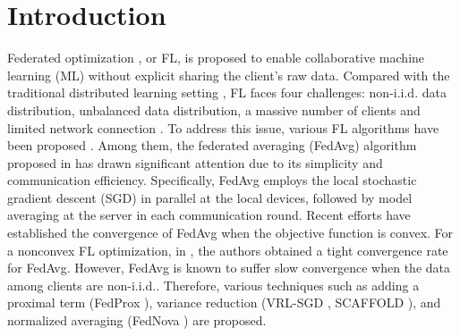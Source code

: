 \documentclass[twoside,journal]{IEEEtran}
\begin{document}






%
\IEEEpeerreviewmaketitle


\vspace{-0.3cm}
\section{Introduction}
\vspace{-0.0cm}
Federated optimization \cite{McMahan2017,li2019federated,yang2019federated}, or FL, is proposed to enable collaborative machine learning (ML) without explicit sharing the client's raw data.
Compared with the traditional distributed learning setting \cite{chang2020distributed}, FL faces four challenges: non-i.i.d. data distribution, unbalanced data distribution, a massive number of clients and limited network connection \cite{konevcny2016federated}. To address this issue, various FL algorithms have been proposed \cite{yang2019federated}. Among them, the federated averaging (FedAvg) algorithm proposed in \cite{McMahan2017} has drawn significant attention due to its simplicity and communication efficiency. Specifically, FedAvg employs the local stochastic gradient descent (SGD) \cite{stich2018local} in parallel at the local devices, followed by model averaging at the server in each communication round. Recent efforts \cite{li2019convergence,khaled2019first} have established the convergence of FedAvg when the objective function is convex.
For a nonconvex FL optimization, in  \cite{karimireddy2020scaffold}, the authors obtained a tight convergence rate for FedAvg. However, FedAvg is known to
 suffer  slow convergence when the data  among clients are non-i.i.d.. Therefore, various  techniques such as adding a proximal term
(FedProx \cite{li2018federated}),  variance reduction
(VRL-SGD \cite{liang2019variance}, SCAFFOLD \cite{karimireddy2020scaffold}), and  normalized averaging (FedNova \cite{wang2020tackling}) are proposed.
\end{document}
